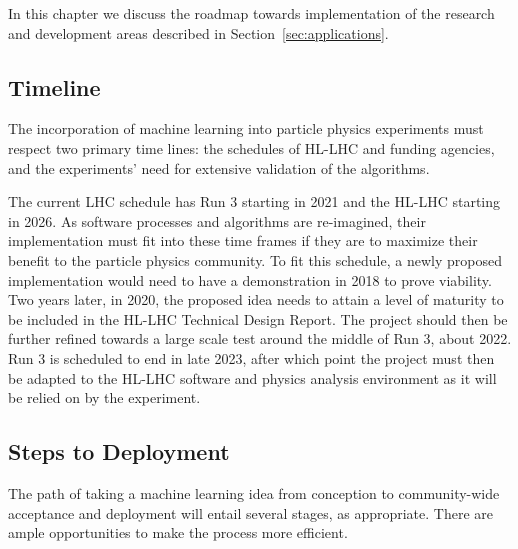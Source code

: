 
In this chapter we discuss the roadmap towards implementation of the research and development areas described in Section~\ref{sec:applications}.

\subsection{Timeline}
The incorporation of machine learning into particle physics experiments must respect two primary time lines: the schedules of HL-LHC and funding agencies, and the experiments' need for extensive validation of the algorithms.

The current LHC schedule has Run 3 starting in 2021 and the HL-LHC starting in 2026. As software processes and algorithms are re-imagined, their implementation must fit into these time frames if they are to maximize their benefit to the particle physics community. To fit this schedule, a newly proposed implementation would need to have a demonstration in 2018 to prove viability. Two years later, in 2020, the proposed idea needs to attain a level of maturity to be included in the HL-LHC Technical Design Report. The project should then be further refined towards a large scale test around the middle of Run 3, about 2022. Run 3 is scheduled to end in late 2023, after which point the project must then be adapted to the HL-LHC software and physics analysis environment as it will be relied on by the experiment.
%

\subsection{Steps to Deployment}
The path of taking a machine learning idea from conception to community-wide acceptance and deployment will entail several stages, as appropriate. There are ample opportunities to make the process more efficient.

